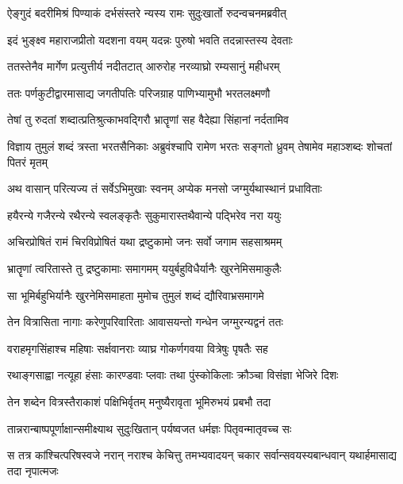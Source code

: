 \twolineshloka
{ऐङ्गुदं बदरीमिश्रं पिण्याकं दर्भसंस्तरे}
{न्यस्य रामः सुदुःखार्तो रुदन्वचनमब्रवीत्} %

\twolineshloka
{इदं भुङ्क्ष्व महाराजप्रीतो यदशना वयम्}
{यदन्नः पुरुषो भवति तदन्नास्तस्य देवताः} %

\twolineshloka
{ततस्तेनैव मार्गेण प्रत्युत्तीर्य नदीतटात्}
{आरुरोह नरव्याघ्रो रम्यसानुं महीधरम्} %

\twolineshloka
{ततः पर्णकुटीद्वारमासाद्य जगतीपतिः}
{परिजग्राह पाणिभ्यामुभौ भरतलक्ष्मणौ} %

\twolineshloka
{तेषां तु रुदतां शब्दात्प्रतिश्रुत्काभवद्गिरौ}
{भ्रातॄणां सह वैदेह्या सिंहानां नर्दतामिव} %

\threelineshloka
{विज्ञाय तुमुलं शब्दं त्रस्ता भरतसैनिकाः}
{अब्रुवंश्चापि रामेण भरतः सङ्गतो ध्रुवम्}
{तेषामेव महाञ्शब्दः शोचतां पितरं मृतम्} %

\twolineshloka
{अथ वासान् परित्यज्य तं सर्वेऽभिमुखाः स्वनम्}
{अप्येक मनसो जग्मुर्यथास्थानं प्रधाविताः} %

\twolineshloka
{हयैरन्ये गजैरन्ये रथैरन्ये स्वलङ्कृतैः}
{सुकुमारास्तथैवान्ये पद्भिरेव नरा ययुः} %

\twolineshloka
{अचिरप्रोषितं रामं चिरविप्रोषितं यथा}
{द्रष्टुकामो जनः सर्वो जगाम सहसाश्रमम्} %

\twolineshloka
{भ्रातॄणां त्वरितास्ते तु द्रष्टुकामाः समागमम्}
{ययुर्बहुविधैर्यानैः खुरनेमिसमाकुलैः} %

\twolineshloka
{सा भूमिर्बहुभिर्यानैः खुरनेमिसमाहता}
{मुमोच तुमुलं शब्दं द्यौरिवाभ्रसमागमे} %

\twolineshloka
{तेन वित्रासिता नागाः करेणुपरिवारिताः}
{आवासयन्तो गन्धेन जग्मुरन्यद्वनं ततः} %

\twolineshloka
{वराहमृगसिंहाश्च महिषाः सर्क्षवानराः}
{व्याघ्र गोकर्णगवया वित्रेषुः पृषतैः सह} %

\twolineshloka
{रथाङ्गसाह्वा नत्यूहा हंसाः कारण्डवाः प्लवाः}
{तथा पुंस्कोकिलाः क्रौञ्चा विसंज्ञा भेजिरे दिशः} %

\twolineshloka
{तेन शब्देन वित्रस्तैराकाशं पक्षिभिर्वृतम्}
{मनुष्यैरावृता भूमिरुभयं प्रबभौ तदा} %

\twolineshloka
{तान्नरान्बाष्पपूर्णाक्षान्समीक्ष्याथ सुदुःखितान्}
{पर्यष्वजत धर्मज्ञः पितृवन्मातृवच्च सः} %

\fourlineindentedshloka
{स तत्र कांश्चित्परिषस्वजे नरान्}
{नराश्च केचित्तु तमभ्यवादयन्}
{चकार सर्वान्सवयस्यबान्धवान्}
{यथार्हमासाद्य तदा नृपात्मजः} %

